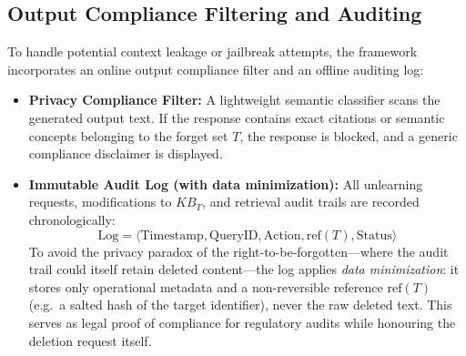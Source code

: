 \subsection{Output Compliance Filtering and Auditing}
To handle potential context leakage or jailbreak attempts, the framework incorporates an online output compliance filter and an offline auditing log:
\begin{itemize}
    \item \textbf{Privacy Compliance Filter:} A lightweight semantic classifier scans the generated output text. If the response contains exact citations or semantic concepts belonging to the forget set $T$, the response is blocked, and a generic compliance disclaimer is displayed.
    \item \textbf{Immutable Audit Log (with data minimization):} All unlearning requests, modifications to $KB_T$, and retrieval audit trails are recorded chronologically:
    \begin{equation}
        \text{Log} = \langle \text{Timestamp}, \text{QueryID}, \text{Action}, \text{ref}(T), \text{Status} \rangle
    \end{equation}
    To avoid the privacy paradox of the right-to-be-forgotten---where the audit trail could itself retain deleted content---the log applies \emph{data minimization}: it stores only operational metadata and a non-reversible reference $\text{ref}(T)$ (e.g.\ a salted hash of the target identifier), never the raw deleted text. This serves as legal proof of compliance for regulatory audits while honouring the deletion request itself.
\end{itemize}

